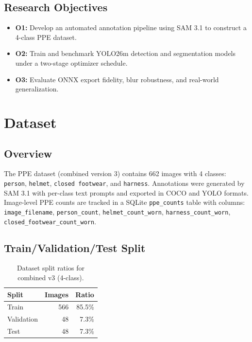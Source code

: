 \documentclass[a4paper,11pt]{article}
\begin{document}
\subsection{Research Objectives}

\begin{itemize}[leftmargin=2cm, itemsep=2pt]
  \item \textbf{O1:} Develop an automated annotation pipeline using SAM 3.1 to construct a 4-class PPE dataset.
  \item \textbf{O2:} Train and benchmark YOLO26m detection and segmentation models under a two-stage optimizer schedule.
  \item \textbf{O3:} Evaluate ONNX export fidelity, blur robustness, and real-world generalization.
\end{itemize}

\section{Dataset}

\subsection{Overview}

The PPE dataset (combined version 3) contains 662 images with 4 classes: \texttt{person}, \texttt{helmet}, \texttt{closed footwear}, and \texttt{harness}. Annotations were generated by SAM 3.1 with per-class text prompts and exported in COCO and YOLO formats. Image-level PPE counts are tracked in a SQLite \texttt{ppe\_counts} table with columns: \texttt{image\_filename}, \texttt{person\_count}, \texttt{helmet\_count\_worn}, \texttt{harness\_count\_worn}, \texttt{closed\_footwear\_count\_worn}.

\subsection{Train/Validation/Test Split}

\begin{table}[H]
\centering
\begin{tabular}{lrr}
\toprule
\textbf{Split} & \textbf{Images} & \textbf{Ratio} \\
\midrule
Train      & 566 & 85.5\% \\
Validation & 48  & 7.3\% \\
Test       & 48  & 7.3\% \\
\bottomrule
\end{tabular}
\caption{Dataset split ratios for combined v3 (4-class).}
\label{tab:split}
\end{table}
\end{document}
